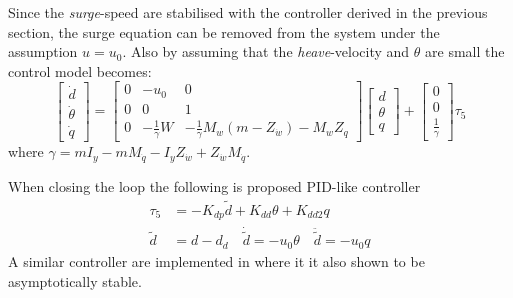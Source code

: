 		Since the \textit{surge}-speed are stabilised with the controller derived in the previous
		section, the surge equation can be removed from the system under the assumption $u = u_0$.		
		Also by assuming that the \textit{heave}-velocity and $\theta$ are small the control model
		becomes:
		\begin{equation}
			\left [ \begin{matrix}
					\dot{d} \\
					\dot{\theta} \\
					\dot{q} 
				\end{matrix}
				\right ] = \left [ \begin{matrix}
							0 & -u_0 &  0 \\
							0 & 0 &   1 \\
							0 & -\frac{1}{\gamma} W &-\frac{1}{\gamma}M_{w} 
							(m - Z_{\dot{w}})-M_w Z_q
						\end{matrix} \right ] 
				\left [ \begin{matrix}
						d \\
						\theta \\
						q
					\end{matrix} \right] + \left [ \begin{matrix}
										0 \\
										0 \\
										\frac{1}{\gamma}
									\end{matrix} \right] \tau_5
		\end{equation}
		where $\gamma = m I_y - m M_{\dot{q}} - I_y Z_{\dot{w}} + Z_{\dot{w}} M_{\dot{q}}$.
		
		When closing the loop the following is proposed PID-like controller
		\begin{equation}
			\begin{aligned}
				\tau_5 &= -K_{dp} \tilde{d} + K_{dd}  \theta + K_{dd2} q \\
				\tilde{d} &= d - d_d \quad \dot{\tilde{d}} = -u_0\theta \quad
				\ddot{\tilde{d}} = -u_0q
			\end{aligned}
		\end{equation}
		A similar controller are implemented in \cite{NDRE-AUV} where it it also shown to be asymptotically
		stable.
				

	

